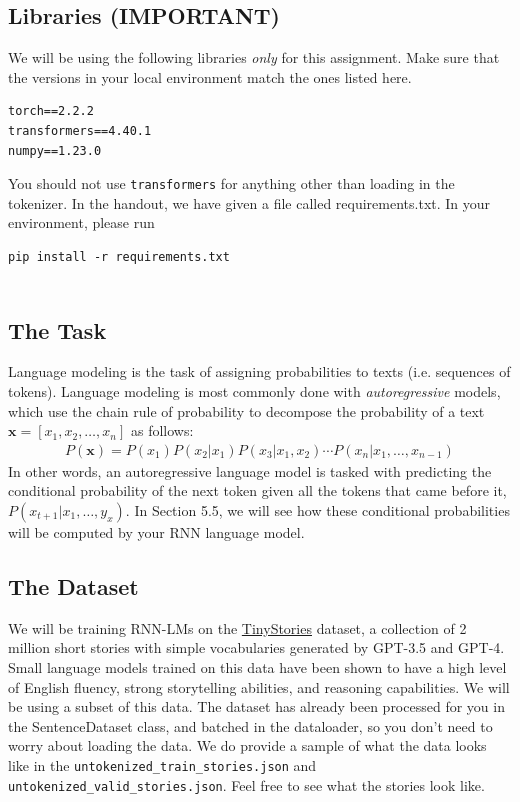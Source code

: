 \documentclass[11pt,addpoints,answers]{exam}
\newcommand{\xv}{\mathbf{x}}
\begin{document}
\subsection{Libraries (IMPORTANT)}

We will be using the following libraries \textit{only} for this assignment. Make sure that the versions in your local environment match the ones listed here.

\begin{lstlisting}
torch==2.2.2
transformers==4.40.1
numpy==1.23.0
\end{lstlisting}

You should not use \texttt{transformers} for anything other than loading in the tokenizer. In the handout, we have given a file called requirements.txt. In your environment, please run \begin{lstlisting}
pip install -r requirements.txt
    
\end{lstlisting}

\subsection{The Task}\label{task}

Language modeling is the task of assigning probabilities to texts (i.e. sequences of tokens). Language modeling is most commonly done with \textit{autoregressive} models, which use the chain rule of probability to decompose the probability of a text $\xv = [ x_1, x_2, \ldots, x_n ]$ as follows:
\begin{align*}
    P(\xv) = P(x_1) P(x_2 | x_1) P(x_3 | x_1, x_2) \cdots P(x_n | x_1,\ldots,x_{n-1})
\end{align*}
In other words, an autoregressive language model is tasked with predicting the conditional probability of the next token given all the tokens that came before it, $P(x_{t+1} | x_1,\ldots,y_{x})$. In Section 5.5, we will see how these conditional probabilities will be computed by your RNN language model.


\subsection{The Dataset}\label{dataset}
We will be training RNN-LMs on the \href{https://huggingface.co/datasets/roneneldan/TinyStories}{TinyStories} dataset, a collection of 2 million short stories with simple vocabularies generated by GPT-3.5 and GPT-4. Small language models trained on this data have been shown to have a high level of English fluency, strong storytelling abilities, and reasoning capabilities. We will be using a subset of this data. The dataset has already been processed for you in the SentenceDataset class, and batched in the dataloader, so you don't need to worry about loading the data. We do provide a sample of what the data looks like in the \texttt{untokenized\_train\_stories.json} and \texttt{untokenized\_valid\_stories.json}. Feel free to see what the stories look like.
\end{document}
